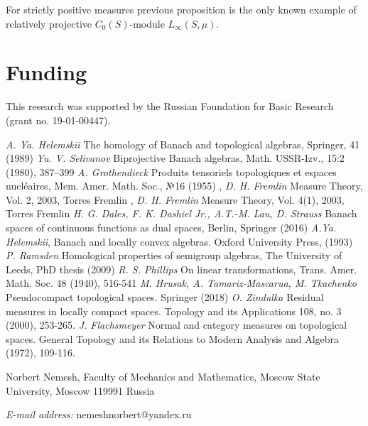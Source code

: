 \documentclass[12pt]{article}
\begin{document}
For strictly positive measures previous proposition is the only known example of relatively projective $C_0(S)$-module $L_\infty(S,\mu)$.

\section{Funding}
\label{SectionFunding}
This research was supported by the Russian Foundation for Basic Research (grant no. 19-01-00447).

\begin{thebibliography}{999}
    \textit{A. Ya. Helemskii} The homology of Banach and topological algebras, Springer, 41 (1989)
    \textit{Yu. V. Selivanov} Biprojective Banach algebras, Math. USSR-Izv., 15:2 (1980), 387–399
    \textit{A. Grothendieck} Produits tensoriels topologiques et espaces nucl{\'e}aires, Mem. Amer. Math. Soc., №16 (1955)
    ,
    \textit{D. H. Fremlin} Measure Theory, Vol. 2, {2003}, Torres Fremlin
    ,
    \textit{D. H. Fremlin} Measure Theory, Vol. 4(1), {2003}, Torres Fremlin
    \textit{H. G. Dales, F. K. Dashiel Jr., A.T.-M. Lau, D. Strauss} Banach spaces of continuous functions as dual spaces, Berlin, Springer (2016)
    \textit{A.Ya. Helemskii}, Banach and locally convex algebras. Oxford University Press, (1993)
    \textit{P. Ramsden} Homological properties of semigroup algebras, The University of Leeds, PhD thesis (2009)
    \textit{R. S. Phillips} On linear transformations, Trans. Amer. Math. Soc. 48 (1940), 516-541
    \textit{M. Hrusak, A. Tamariz-Mascarua, M. Tkachenko} Pseudocompact topological spaces. Springer (2018)
    \textit{O. Zindulka} Residual measures in locally compact spaces. Topology and its Applications 108, no. 3 (2000), 253-265.
    \textit{J. Flachsmeyer} Normal and category measures on topological spaces. General Topology and its Relations to Modern Analysis and Algebra (1972), 109-116.
\end{thebibliography}

Norbert Nemesh, Faculty of Mechanics and Mathematics, Moscow State University, Moscow 119991 Russia

\textit{E-mail address:} nemeshnorbert@yandex.ru
\end{document}
